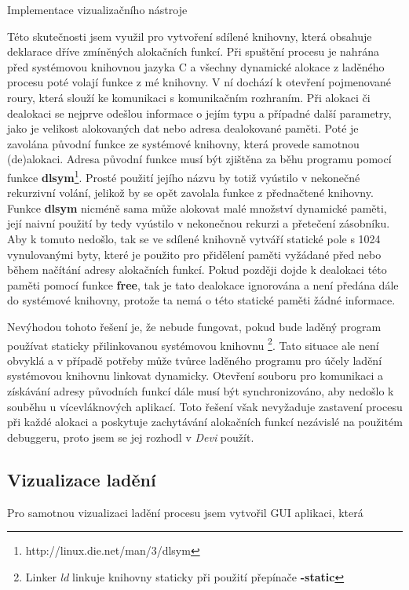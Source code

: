 \documentclass[bc,male,python,dept460]{diploma}						%
\newcommand{\parspace}[1][]{
	\ifthenelse{\isempty{#1}}{\vspace{5mm}}{\vspace{#1}}
	\par
}
\begin{document}
\begin{section}{Implementace vizualizačního nástroje}
\begin{description}
\begin{description}
				\parspace Této skutečnosti jsem využil pro vytvoření sdílené knihovny, která obsahuje deklarace dříve zmíněných alokačních funkcí.
				Při spuštění procesu je nahrána před systémovou knihovnou jazyka C a všechny dynamické alokace z laděného procesu poté volají funkce z mé knihovny.
				V ní dochází k otevření pojmenované roury, která slouží ke komunikaci s komunikačním rozhraním. %
				Při alokaci či dealokaci se nejprve odešlou informace o jejím typu a případné další parametry, jako je velikost alokovaných dat
				nebo adresa dealokované paměti. Poté je zavolána původní funkce ze systémové knihovny, která provede samotnou (de)alokaci.
				Adresa původní funkce musí být zjištěna za běhu programu pomocí
				funkce \textbf{dlsym}\footnote{http://linux.die.net/man/3/dlsym}. Prosté použití jejího názvu by totiž vyústilo v nekonečné rekurzivní volání, jelikož
				by se opět zavolala funkce z přednačtené knihovny. Funkce \textbf{dlsym} nicméně sama může alokovat malé množství dynamické paměti,
				její naivní použití by tedy vyústilo v nekonečnou rekurzi a přetečení zásobníku.
				Aby k tomuto nedošlo, tak se ve sdílené knihovně vytváří statické pole s 1024 vynulovanými
				byty, které je použito pro přidělení paměti vyžádané před nebo během načítání adresy alokačních funkcí. Pokud později dojde k dealokaci této
				paměti pomocí funkce \textbf{free}, tak je tato dealokace ignorována a není předána dále do systémové knihovny, protože ta nemá o této statické paměti
				žádné informace.
				
				\parspace Nevýhodou tohoto řešení je, že nebude fungovat, pokud bude laděný program používat staticky přilinkovanou systémovou knihovnu
				\footnote{Linker \textit{ld} linkuje knihovny staticky při použití přepínače \textbf{-static}}.
				Tato situace ale není obvyklá a v případě potřeby může tvůrce laděného programu pro účely ladění systémovou knihovnu linkovat dynamicky.
				Otevření souboru pro komunikaci a získávání adresy původních funkcí dále musí být synchronizováno, aby nedošlo k souběhu u vícevláknových aplikací.
				Toto řešení však nevyžaduje zastavení procesu při každé alokaci a poskytuje zachytávání alokačních funkcí nezávislé na použitém debuggeru, proto
				jsem se jej rozhodl v \textit{Devi} použít.
				
			\end{description}
			
			
		\end{description}
			
	\subsection{Vizualizace ladění}
	Pro samotnou vizualizaci ladění procesu jsem vytvořil GUI aplikaci, která 
	

\end{section}
\end{document}
